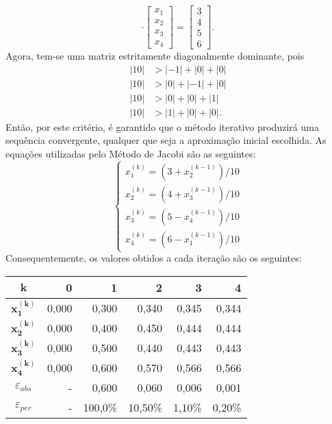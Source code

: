 \documentclass[12pt,a4paper]{article}
\begin{document}
\begin{ExerciseList}
\[\cdot
\begin{bmatrix}
x_1 \\ x_2 \\ x_3 \\ x_4
\end{bmatrix}
=
\begin{bmatrix}
3 \\ 4 \\ 5 \\ 6
\end{bmatrix}.
\]
Agora, tem-se uma matriz estritamente diagonalmente dominante, pois
\begin{align*}
|10| & > |-1| + |0| + |0|\\
|10| & > |0| + |-1| + |0|\\
|10| & > |0| + |0| + |1|\\
|10| & > |1| + |0| + |0|.
\end{align*}
Então, por este critério, é garantido que o método iterativo produzirá uma sequência convergente, qualquer que seja a aproximação inicial escolhida. As equações utilizadas pelo Método de Jacobi são as seguintes:
\[
\begin{cases}
x_1^{(k)} = (3 + x_2^{(k-1)})/10\\
x_2^{(k)} = (4 + x_3^{(k-1)})/10\\
x_3^{(k)} = (5 - x_4^{(k-1)})/10\\
x_4^{(k)} = (6 - x_1^{(k-1)})/10
\end{cases}
\]
Consequentemente, os valores obtidos a cada iteração são os seguintes:
\medskip
\begin{center}
\begin{tabular}{crrrrr}
\hline
$\boldsymbol{k}$     & 0 & 1 & 2 & 3 & 4\\
\hline
$\boldsymbol{x_1^{(k)}}$ & 0,000 & 0,300 & 0,340 & 0,345 & 0,344\\
$\boldsymbol{x_2^{(k)}}$ & 0,000 & 0,400 & 0,450 & 0,444 & 0,444 \\
$\boldsymbol{x_3^{(k)}}$ & 0,000 & 0,500 & 0,440 & 0,443 & 0,443 \\
$\boldsymbol{x_4^{(k)}}$ & 0,000 & 0,600 & 0,570 & 0,566 & 0,566 \\
\hline
$\varepsilon_{abs}$ & - & 0,600 & 0,060 & 0,006 & 0,001 \\
\hline
$\varepsilon_{per}$ & - & 100,0\% & 10,50\% & 1,10\% & 0,20\% \\
\hline
\end{tabular}
\end{center}
\medskip


\end{ExerciseList}
\end{document}
